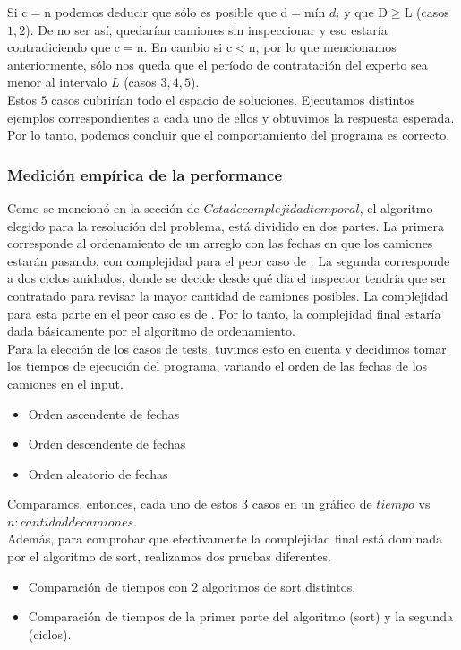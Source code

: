\documentclass[11pt, a4paper, twoside]{article}
\begin{document}
Si c$=$n podemos deducir que sólo es posible que d$=$mín $d_i$ y que D$\ge$L (casos $1,2$). De no ser así, quedarían camiones sin inspeccionar y eso estaría contradiciendo que c$=$n. En cambio si c$<$n, por lo que mencionamos anteriormente, sólo nos queda que el período de contratación del experto sea menor al intervalo $L$ (casos $3,4,5$). \\
Estos $5$ casos cubrirían todo el espacio de soluciones. Ejecutamos distintos ejemplos correspondientes a cada uno de ellos y obtuvimos la respuesta esperada. Por lo tanto, podemos concluir que el comportamiento del programa es correcto. 

\subsubsection{Medición empírica de la performance}

Como se mencionó en la sección de $Cota de complejidad temporal$, el algoritmo elegido para la resolución del problema,
está dividido en dos partes. La primera corresponde al ordenamiento de un arreglo con las fechas en que los 
camiones estarán pasando, con complejidad para el peor caso de . La segunda corresponde a dos ciclos
anidados, donde se decide desde qué día el inspector tendría que ser contratado para revisar la mayor cantidad 
de camiones posibles. La complejidad para esta parte en el peor caso es de . Por lo tanto, la complejidad
final estaría dada básicamente por el algoritmo de ordenamiento. \\
Para la elección de los casos de tests, tuvimos esto en cuenta y decidimos tomar los tiempos de ejecución del programa,
variando el orden de las fechas de los camiones en el input. 

\begin{itemize}
\item Orden ascendente de fechas
\item Orden descendente de fechas
\item Orden aleatorio de fechas
\end{itemize}     

Comparamos, entonces, cada uno de estos $3$ casos en un gráfico de $tiempo$ vs $n: cantidad de camiones$. \\


Además, para comprobar que efectivamente la complejidad final está dominada por el algoritmo de sort, realizamos dos
pruebas diferentes. \\

\begin{itemize}
\item Comparación de tiempos con $2$ algoritmos de sort distintos. 
\item Comparación de tiempos de la primer parte del algoritmo (sort) y la segunda (ciclos). 
\end{itemize}  
 

\end{document}
